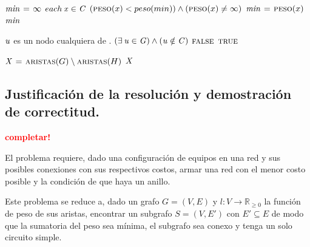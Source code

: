 \vspace*{0.3cm}


\begin{codebox}
\li $\id{min} \gets \infty$
\li \For $each \hspace{0.07cm} \id{x} \in \id{C}$
\li     \Do
            \If $(\textnormal{\scshape peso}(x) < {peso}(min)) \land (\textnormal{\scshape peso}(x) \neq \infty)$
\li             \Then
                    $\id{min} \gets \proc{peso}(x)$
                \End
        \End
\li \Return $\id{min}$
\end{codebox}


\vspace*{0.3cm}


\begin{codebox}
\li \Comment $\id{u}$ es un nodo cualquiera de .
\li \If $(\exists \hspace{0.07cm} \id{u} \in \id{G}) \land (\id{u} \notin \id{C})$
\li     \Then
            \Return $\textnormal{\scshape false}$
        \End
\li \Return $\textnormal{\scshape true}$
\end{codebox}


\vspace*{0.3cm}


\begin{codebox}
\li $\id{X} \gets \proc{aristas}(G) \setminus \proc{aristas}(H)$
\li \Return $\id{X}$
\end{codebox}



\newpage
\subsection{Justificación de la resolución y demostración de correctitud.}

\vspace*{0.3cm}

\textcolor{red}{\textbf{completar!}}

El problema requiere, dado una configuración de equipos en una red y sus
posibles conexiones con sus respectivos costos, armar una red con el menor
costo posible y la condición de que haya un anillo.

Este problema se reduce a, dado un grafo $G = (V, E)$ y $l: V \to
\mathbb{R}_{\geq 0}$ la función de peso de sus aristas, encontrar un
subgrafo $S = (V, E')$ con $E' \subseteq E$ de modo que la sumatoria del
peso sea mínima, el subgrafo sea conexo y tenga un solo circuito simple.


